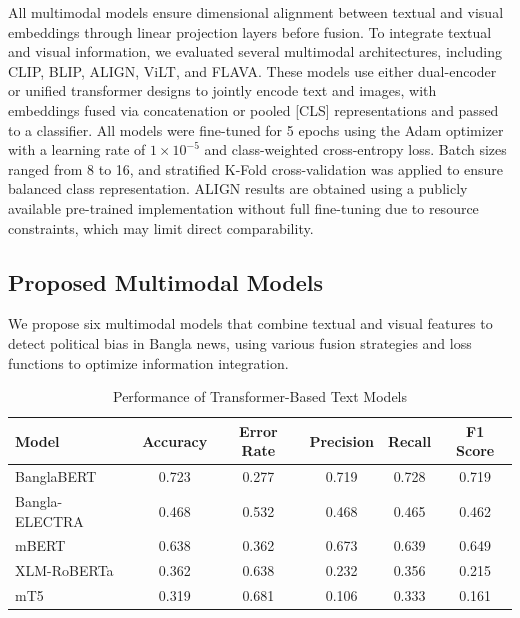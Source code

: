 \documentclass[11pt]{article}
\begin{document}
All multimodal models ensure dimensional alignment between textual and visual embeddings through linear projection layers before fusion. To integrate textual and visual information, we evaluated several multimodal architectures, including CLIP, BLIP, ALIGN, ViLT, and FLAVA. These models use either dual-encoder or unified transformer designs to jointly encode text and images, with embeddings fused via concatenation or pooled [CLS] representations and passed to a classifier. All models were fine-tuned for 5 epochs using the Adam optimizer with a learning rate of $1\times10^{-5}$ and class-weighted cross-entropy loss. Batch sizes ranged from 8 to 16, and stratified K-Fold cross-validation was applied to ensure balanced class representation. ALIGN results are obtained using a publicly available pre-trained implementation without full fine-tuning due to resource constraints, which may limit direct comparability.


\subsection{Proposed Multimodal Models}

We propose six multimodal models that combine textual and visual features to detect political bias in Bangla news, using various fusion strategies and loss functions to optimize information integration.

\begin{table}[t]
\footnotesize
\centering
\caption{Performance of Transformer-Based Text Models}
\begin{tabular}{|l|c|c|c|c|c|}
\hline
\textbf{Model} & \textbf{Accuracy} & \textbf{Error Rate} & \textbf{Precision} & \textbf{Recall} & \textbf{F1 Score} \\
\hline
BanglaBERT & 0.723 & 0.277 & 0.719 & 0.728 & 0.719 \\
Bangla-ELECTRA & 0.468 & 0.532 & 0.468 & 0.465 & 0.462 \\
mBERT & 0.638 & 0.362 & 0.673 & 0.639 & 0.649 \\
XLM-RoBERTa & 0.362 & 0.638 & 0.232 & 0.356 & 0.215 \\
mT5 & 0.319 & 0.681 & 0.106 & 0.333 & 0.161 \\
\hline
\end{tabular}
\label{tab:text_models}
\end{table}
\end{document}
